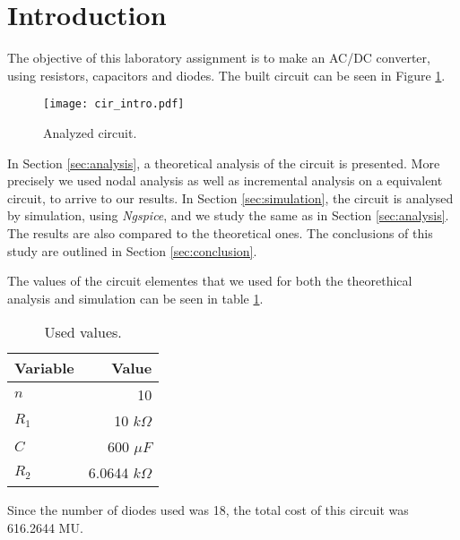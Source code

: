 \section{Introduction}
\label{sec:introduction}

The objective of this laboratory assignment is to make an AC/DC converter, using resistors, capacitors and diodes. The built circuit can be seen in Figure \ref{fig:cir_intro}.

\begin{figure}[H] \centering
\texttt{[image: cir\_intro.pdf]}
\caption{Analyzed circuit.}
\label{fig:cir_intro}
\end{figure}

In Section \ref{sec:analysis}, a theoretical analysis of the circuit is
presented. More precisely we used nodal analysis as well as incremental analysis on a equivalent circuit, to arrive to our results.
In Section \ref{sec:simulation}, the circuit is analysed by simulation, using \textit{Ngspice}, and we study the same as in Section \ref{sec:analysis}. The results are also compared to the theoretical ones. The conclusions of this study are outlined in Section \ref{sec:conclusion}.
\par
The values of the circuit elementes that we used for both the theorethical analysis and simulation can be seen in table \ref{tab:intro_values}.

\begin{table}[H]
  \centering
  \begin{tabular}{|l|r|}
    \hline
        {\bf Variable} & {\bf Value} \\ \hline
        $n$ & 10 \\ \hline
        $R_1$ & 10 $k\Omega$ \\ \hline
        $C$ & 600 $\mu F$ \\ \hline
        $R_2$ & 6.0644 $k\Omega$ \\ \hline
  \end{tabular}
  \caption{Used values.}
  \label{tab:intro_values}
\end{table}

Since the number of diodes used was 18, the total cost of this circuit was 616.2644 MU.

